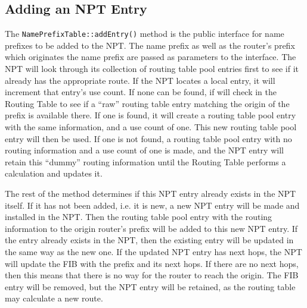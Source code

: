 \subsection{Adding an NPT Entry}
\label{sec:npt-add}
The \texttt{NamePrefixTable::addEntry()} method is the public interface for name prefixes to be added to the NPT.
The name prefix as well as the router's prefix which originates the name prefix are passed as parameters to the interface.
The NPT will look through its collection of routing table pool entries first to see if it already has the appropriate route.
If the NPT locates a local entry, it will increment that entry's use count.
If none can be found, if will check in the Routing Table to see if a ``raw'' routing table entry matching the origin of the prefix is available there.
If one is found, it will create a routing table pool entry with the same information, and a use count of one. This new routing table pool entry will then be used.
If one is not found, a routing table pool entry with no routing information and a use count of one is made, and the NPT entry will retain this ``dummy'' routing information until the Routing Table performs a calculation and updates it.

The rest of the method determines if this NPT entry already exists in the NPT itself.
If it has not been added, i.e. it is new, a new NPT entry will be made and installed in the NPT.
Then the routing table pool entry with the routing information to the origin router's prefix will be added to this new NPT entry.
If the entry already exists in the NPT, then the existing entry will be updated in the same way as the new one.
If the updated NPT entry has next hops, the NPT will update the FIB with the prefix and its next hops.
If there are no next hops, then this means that there is no way for the router to reach the origin.
The FIB entry will be removed, but the NPT entry will be retained, as the routing table may calculate a new route.

